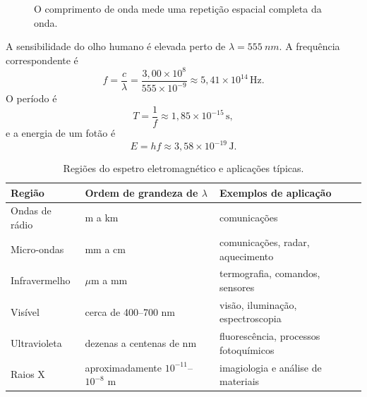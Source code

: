 \documentclass[11pt,a4paper,oneside]{book}
\begin{document}
\begin{figure}[H]
\centering
{}
\caption{O comprimento de onda mede uma repetição espacial completa da onda.}
\end{figure}

\begin{exemplo}[title={Exemplo resolvido -- frequência, período e energia}]
A sensibilidade do olho humano é elevada perto de $\lambda=\SI{555}{nm}$. A frequência correspondente é
\[
f=\frac{c}{\lambda}=\frac{3{,}00\times10^8}{555\times10^{-9}}
 \approx5{,}41\times10^{14}\,\mathrm{Hz}.
\]
O período é
\[
T=\frac1f\approx1{,}85\times10^{-15}\,\mathrm{s},
\]
e a energia de um fotão é
\[
E=hf\approx3{,}58\times10^{-19}\,\mathrm{J}.
\]
\end{exemplo}

\begin{table}[H]
\centering
\caption{Regiões do espetro eletromagnético e aplicações típicas.}
\renewcommand{\arraystretch}{1.18}\begin{tabularx}{\textwidth}{lXX}
\toprule
Região & Ordem de grandeza de $\lambda$ & Exemplos de aplicação \\
\midrule
Ondas de rádio & m a km & comunicações \\
Micro-ondas & mm a cm & comunicações, radar, aquecimento \\
Infravermelho & $\mu$m a mm & termografia, comandos, sensores \\
Visível & cerca de 400--700 nm & visão, iluminação, espectroscopia \\
Ultravioleta & dezenas a centenas de nm & fluorescência, processos fotoquímicos \\
Raios X & aproximadamente $10^{-11}$--$10^{-8}$ m & imagiologia e análise de materiais \\
\bottomrule
\end{tabularx}\renewcommand{\arraystretch}{1.0}
\end{table}
\end{document}
